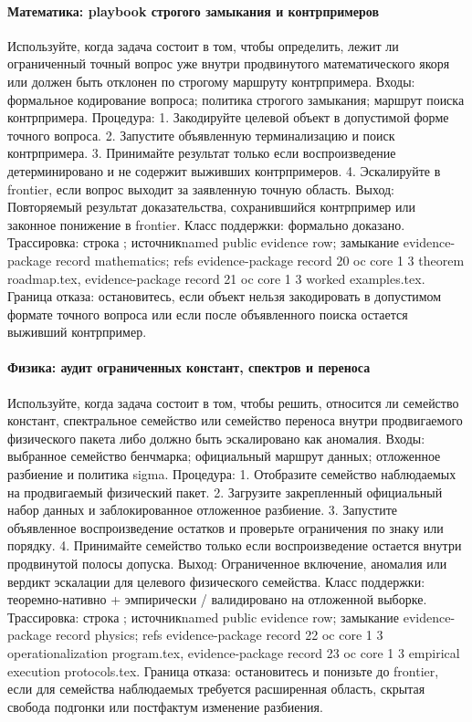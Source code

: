\paragraph{Математика: playbook строгого замыкания и контрпримеров}
Используйте, когда задача состоит в том, чтобы определить, лежит ли ограниченный точный вопрос уже внутри продвинутого математического якоря или должен быть отклонен по строгому маршруту контрпримера.
Входы: формальное кодирование вопроса; \allowbreak политика строгого замыкания; \allowbreak маршрут поиска контрпримера.
Процедура: 1. Закодируйте целевой объект в допустимой форме точного вопроса. 2. Запустите объявленную терминализацию и поиск контрпримера. 3. Принимайте результат только если воспроизведение детерминировано и не содержит выживших контрпримеров. 4. Эскалируйте в frontier, если вопрос выходит за заявленную точную область.
Выход: Повторяемый результат доказательства, сохранившийся контрпример или законное понижение в frontier.
Класс поддержки: формально доказано.
Трассировка: строка ; \allowbreak источникnamed public evidence row; \allowbreak замыкание evidence-package record mathematics; \allowbreak refs evidence-package record 20 oc core 1 3 theorem roadmap.tex, \allowbreak evidence-package record 21 oc core 1 3 worked examples.tex.
Граница отказа: остановитесь, если объект нельзя закодировать в допустимом формате точного вопроса или если после объявленного поиска остается выживший контрпример.

\paragraph{Физика: аудит ограниченных констант, спектров и переноса}
Используйте, когда задача состоит в том, чтобы решить, относится ли семейство констант, спектральное семейство или семейство переноса внутри продвигаемого физического пакета либо должно быть эскалировано как аномалия.
Входы: выбранное семейство бенчмарка; \allowbreak официальный маршрут данных; \allowbreak отложенное разбиение и политика sigma.
Процедура: 1. Отобразите семейство наблюдаемых на продвигаемый физический пакет. 2. Загрузите закрепленный официальный набор данных и заблокированное отложенное разбиение. 3. Запустите объявленное воспроизведение остатков и проверьте ограничения по знаку или порядку. 4. Принимайте семейство только если воспроизведение остается внутри продвинутой полосы допуска.
Выход: Ограниченное включение, аномалия или вердикт эскалации для целевого физического семейства.
Класс поддержки: теоремно-нативно + эмпирически / валидировано на отложенной выборке.
Трассировка: строка ; \allowbreak источникnamed public evidence row; \allowbreak замыкание evidence-package record physics; \allowbreak refs evidence-package record 22 oc core 1 3 operationalization program.tex, \allowbreak evidence-package record 23 oc core 1 3 empirical execution protocols.tex.
Граница отказа: остановитесь и понизьте до frontier, если для семейства наблюдаемых требуется расширенная область, скрытая свобода подгонки или постфактум изменение разбиения.

